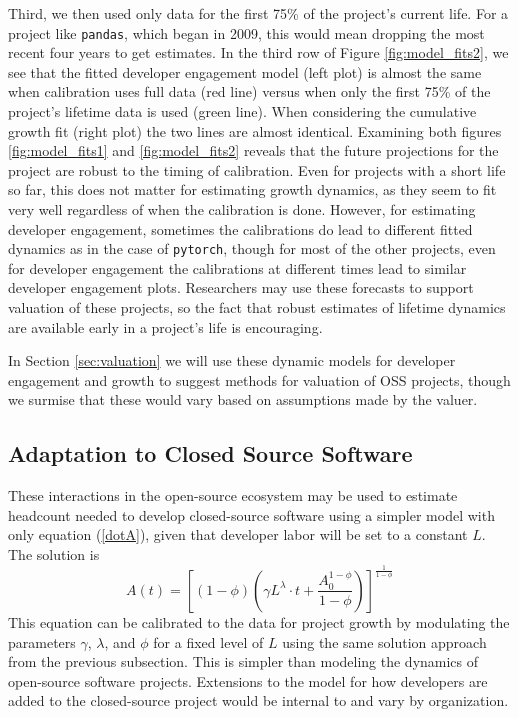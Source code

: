 \documentclass[conference]{IEEEtran}
\begin{document}
Third, we then used only data for the first 75\% of the project's current life. For a project like {\tt pandas}, which began in 2009, this would mean dropping the most recent four years to get estimates. In the third row of Figure \ref{fig:model_fits2}, we see that the fitted developer engagement model (left plot) is almost the same when calibration uses full data (red line) versus when only the first 75\% of the project's lifetime data is used (green line). When considering the cumulative growth fit (right plot) the two lines are almost identical. Examining both figures \ref{fig:model_fits1} and \ref{fig:model_fits2} reveals that the future projections for the project are robust to the timing of calibration. Even for projects with a short life so far, this does not  matter for estimating growth dynamics, as they seem to fit very well regardless of when the calibration is done. However, for estimating developer engagement, sometimes the calibrations do lead to different fitted dynamics as in the case of {\tt pytorch}, though for most of the other projects, even for developer engagement the calibrations at different times lead to similar developer engagement plots. Researchers may use these forecasts to support valuation of these projects, so the fact that robust estimates of lifetime dynamics are available early in a project's life is encouraging. 

In Section \ref{sec:valuation} we will use these dynamic models for developer engagement and growth to suggest methods for valuation of OSS projects, though we surmise that these would vary based on assumptions made by the valuer. 





\subsection{Adaptation to Closed Source Software}

These interactions in the open-source ecosystem may be used to estimate headcount needed to develop closed-source software using a simpler model with only equation (\ref{dotA}), given that developer labor will be set to a constant $L$. The solution is 
\begin{equation}
A(t) = \left[(1-\phi)\left(\gamma L^{\lambda}\cdot t + \frac{A_0^{1-\phi}}{1-\phi} \right) \right]^{\frac{1}{1-\phi}} \label{n0}
\end{equation}
This equation can be calibrated to the data for project growth by modulating the parameters $\gamma$, $\lambda$, and $\phi$ for a fixed level of $L$ using the same solution approach from the previous subsection. This is simpler than modeling the dynamics of open-source software projects. Extensions to the model for how developers are added to the closed-source project would be internal to and vary by organization. 
\end{document}
